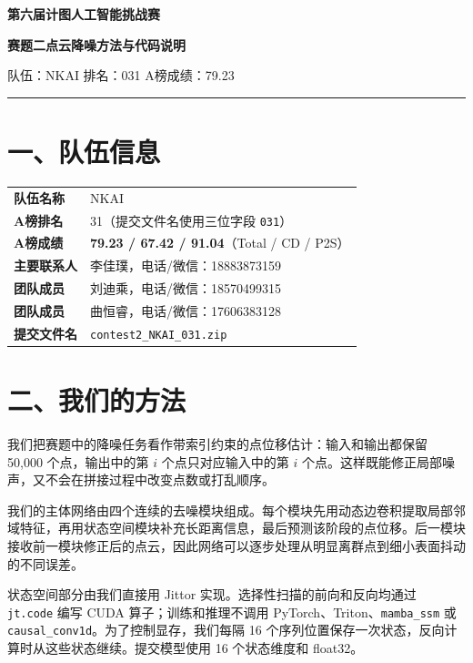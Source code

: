 \documentclass[UTF8,a4paper,11pt,fontset=fandol]{ctexart}
\newcommand{\code}[1]{\nolinkurl{#1}}
\begin{document}
\begin{center}
  {\bfseries 第六届计图人工智能挑战赛}\par
  \vspace{0.35em}
  {\bfseries 赛题二点云降噪方法与代码说明}\par
  \vspace{1.2em}
  {\color{NKBlue}队伍：NKAI \quad 排名：031 \quad A榜成绩：79.23}\par
  \vspace{0.8em}
  \rule{0.88\textwidth}{0.6pt}
\end{center}

\section{一、队伍信息}

\begin{tabularx}{\textwidth}{>{\bfseries}p{3.2cm}X}
队伍名称 & NKAI \\
A榜排名 & 31（提交文件名使用三位字段 \code{031}） \\
A榜成绩 & \textbf{79.23 / 67.42 / 91.04}（Total / CD / P2S） \\
主要联系人 & 李佳璞，电话/微信：18883873159 \\
团队成员 & 刘迪乘，电话/微信：18570499315 \\
团队成员 & 曲恒睿，电话/微信：17606383128 \\
提交文件名 & \code{contest2_NKAI_031.zip} \\
\end{tabularx}

\section{二、我们的方法}

我们把赛题中的降噪任务看作带索引约束的点位移估计：输入和输出都保留 50,000 个点，输出中的第 $i$ 个点只对应输入中的第 $i$ 个点。这样既能修正局部噪声，又不会在拼接过程中改变点数或打乱顺序。

我们的主体网络由四个连续的去噪模块组成。每个模块先用动态边卷积提取局部邻域特征，再用状态空间模块补充长距离信息，最后预测该阶段的点位移。后一模块接收前一模块修正后的点云，因此网络可以逐步处理从明显离群点到细小表面抖动的不同误差。

状态空间部分由我们直接用 Jittor 实现。选择性扫描的前向和反向均通过 \code{jt.code} 编写 CUDA 算子；训练和推理不调用 PyTorch、Triton、\code{mamba_ssm} 或 \code{causal_conv1d}。为了控制显存，我们每隔 16 个序列位置保存一次状态，反向计算时从这些状态继续。提交模型使用 16 个状态维度和 float32。
\end{document}
